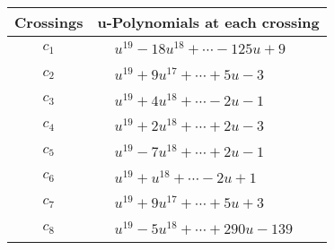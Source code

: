 \documentclass[1p]{elsarticle_modified}
\theoremstyle{definition}
\begin{document}
\begin{tabular}{m{50pt}|m{274pt}}
Crossings & \hspace{64pt}u-Polynomials at each crossing \\
\hline $$\begin{aligned}c_{1}\end{aligned}$$&$\begin{aligned}
&u^{19}-18 u^{18}+\cdots-125 u+9
\end{aligned}$\\
\hline $$\begin{aligned}c_{2}\end{aligned}$$&$\begin{aligned}
&u^{19}+9 u^{17}+\cdots+5 u-3
\end{aligned}$\\
\hline $$\begin{aligned}c_{3}\end{aligned}$$&$\begin{aligned}
&u^{19}+4 u^{18}+\cdots-2 u-1
\end{aligned}$\\
\hline $$\begin{aligned}c_{4}\end{aligned}$$&$\begin{aligned}
&u^{19}+2 u^{18}+\cdots+2 u-3
\end{aligned}$\\
\hline $$\begin{aligned}c_{5}\end{aligned}$$&$\begin{aligned}
&u^{19}-7 u^{18}+\cdots+2 u-1
\end{aligned}$\\
\hline $$\begin{aligned}c_{6}\end{aligned}$$&$\begin{aligned}
&u^{19}+u^{18}+\cdots-2 u+1
\end{aligned}$\\
\hline $$\begin{aligned}c_{7}\end{aligned}$$&$\begin{aligned}
&u^{19}+9 u^{17}+\cdots+5 u+3
\end{aligned}$\\
\hline $$\begin{aligned}c_{8}\end{aligned}$$&$\begin{aligned}
&u^{19}-5 u^{18}+\cdots+290 u-139
\end{aligned}$\\

\end{tabular}
\end{document}
